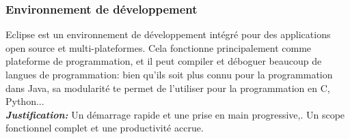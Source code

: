 \subsubsection{Environnement de  développement}
\begin{minipage}{0.2\textwidth}
	\begin{minipage}{\linewidth}
			\label{f3}%
	\end{minipage}
\end{minipage}
\hfill
\begin{minipage}{0.75\textwidth}
	Eclipse est un environnement de développement intégré pour des applications open source et multi-plateformes. Cela fonctionne principalement comme plateforme de programmation, et il peut compiler et déboguer beaucoup de langues de programmation: bien qu'ils soit plus connu pour la programmation dans Java, sa modularité te permet de l'utiliser pour la programmation en C, Python...\\
	
	\textbf{\textit{Justification:}} Un démarrage rapide et une prise en main progressive,. Un scope fonctionnel complet et une productivité accrue.\\
\end{minipage}\\

